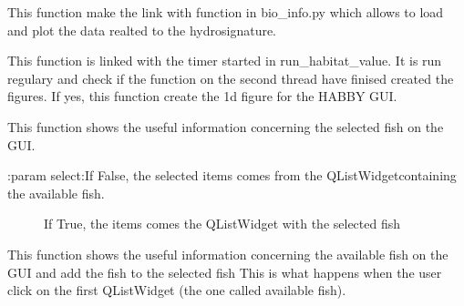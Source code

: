 \documentclass[letterpaper,10pt,english]{sphinxmanual}
\begin{document}
\begin{fulllineitems}
\begin{fulllineitems}
\end{fulllineitems}


\begin{fulllineitems}
\label{\detokenize{index:src_GUI.bio_info_GUI.BioInfo.show_hydrosignature}}
This function make the link with function in bio\_info.py which allows to load and plot the data realted
to the hydrosignature.

\end{fulllineitems}


\begin{fulllineitems}
\label{\detokenize{index:src_GUI.bio_info_GUI.BioInfo.show_image_hab}}
This function is linked with the timer started in run\_habitat\_value. It is run regulary and
check if the function on the second thread have finised created the figures. If yes,
this function create the 1d figure for the HABBY GUI.

\end{fulllineitems}


\begin{fulllineitems}
\label{\detokenize{index:src_GUI.bio_info_GUI.BioInfo.show_info_fish}}
This function shows the useful information concerning the selected fish on the GUI.
\begin{description}
\item[{:param select:If False, the selected items comes from the QListWidgetcontaining the available fish.}] \leavevmode
If True, the items comes the QListWidget with the selected fish

\end{description}

\end{fulllineitems}


\begin{fulllineitems}
\label{\detokenize{index:src_GUI.bio_info_GUI.BioInfo.show_info_fish_avai}}
This function shows the useful information concerning the available fish on the GUI and
add the fish to  the selected fish This is what happens when the user click on the
first QListWidget (the one called available fish).


\end{fulllineitems}
\end{fulllineitems}
\end{document}
